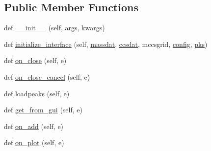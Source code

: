 \subsection*{Public Member Functions}
\begin{DoxyCompactItemize}
\item 
def \hyperlink{class_uni_dec_1_1unidec__modules_1_1_i_m__windows_1_1_i_m_tool_extract_a1b829403c1450abd336ceabeaed59976}{\+\_\+\+\_\+init\+\_\+\+\_\+} (self, args, kwargs)
\item 
def \hyperlink{class_uni_dec_1_1unidec__modules_1_1_i_m__windows_1_1_i_m_tool_extract_a941e5422e19960dc212e06ed35a77575}{initialize\+\_\+interface} (self, \hyperlink{class_uni_dec_1_1unidec__modules_1_1_i_m__windows_1_1_i_m_tool_extract_a84790ca7eef109a664266791935c6bba}{massdat}, \hyperlink{class_uni_dec_1_1unidec__modules_1_1_i_m__windows_1_1_i_m_tool_extract_a588c4eb502155920278764d351201f62}{ccsdat}, mccsgrid, \hyperlink{class_uni_dec_1_1unidec__modules_1_1_i_m__windows_1_1_i_m_tool_extract_a354d23522e36a48e12f4761f4a2788ba}{config}, \hyperlink{class_uni_dec_1_1unidec__modules_1_1_i_m__windows_1_1_i_m_tool_extract_a9bb4ceab1c1da03bc6a1de52207d5000}{pks})
\item 
def \hyperlink{class_uni_dec_1_1unidec__modules_1_1_i_m__windows_1_1_i_m_tool_extract_a545f932cd1c8f5c8c3d190fce540c864}{on\+\_\+close} (self, e)
\item 
def \hyperlink{class_uni_dec_1_1unidec__modules_1_1_i_m__windows_1_1_i_m_tool_extract_a557641091518248020401a053afbf481}{on\+\_\+close\+\_\+cancel} (self, e)
\item 
def \hyperlink{class_uni_dec_1_1unidec__modules_1_1_i_m__windows_1_1_i_m_tool_extract_a1110446eeb314589d8bc105a5bc73b19}{loadpeaks} (self, e)
\item 
def \hyperlink{class_uni_dec_1_1unidec__modules_1_1_i_m__windows_1_1_i_m_tool_extract_a17749c7fa8670bac741bc46f85fcb69a}{get\+\_\+from\+\_\+gui} (self, e)
\item 
def \hyperlink{class_uni_dec_1_1unidec__modules_1_1_i_m__windows_1_1_i_m_tool_extract_a2feb53af2191e1123b95ee82685232dc}{on\+\_\+add} (self, e)
\item 
def \hyperlink{class_uni_dec_1_1unidec__modules_1_1_i_m__windows_1_1_i_m_tool_extract_ab1c3f61ba86865f04a1d875e3197e6cb}{on\+\_\+plot} (self, e)
\end{DoxyCompactItemize}
